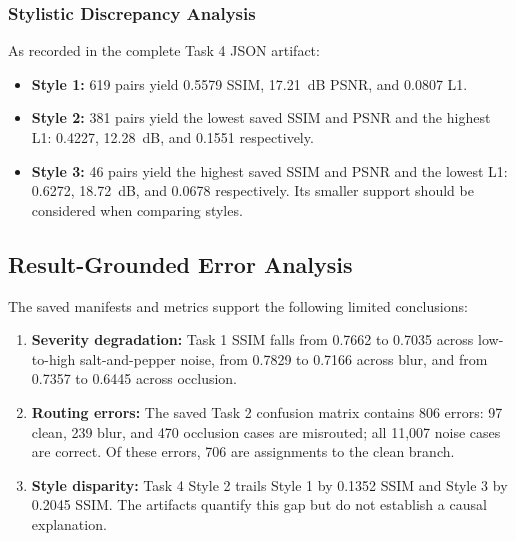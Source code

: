 \documentclass[journal,compsoc]{IEEEtran}
\begin{document}
\begin{table}[!h]
\caption{Task 4 cGAN Performance Breakdown Across Styles (FS2K Test Set, $N=1,046$)}
\label{tab:task4_style_breakdown}
\centering
{}
\end{table}

\subsubsection{Stylistic Discrepancy Analysis}
As recorded in the complete Task 4 JSON artifact:
\begin{itemize}
    \item \textbf{Style 1:} 619 pairs yield 0.5579 SSIM, 17.21~dB PSNR, and 0.0807 L1.
    \item \textbf{Style 2:} 381 pairs yield the lowest saved SSIM and PSNR and the highest L1: 0.4227, 12.28~dB, and 0.1551 respectively.
    \item \textbf{Style 3:} 46 pairs yield the highest saved SSIM and PSNR and the lowest L1: 0.6272, 18.72~dB, and 0.0678 respectively. Its smaller support should be considered when comparing styles.
\end{itemize}

\subsection{Result-Grounded Error Analysis}
The saved manifests and metrics support the following limited conclusions:
\begin{enumerate}
    \item \textbf{Severity degradation:} Task 1 SSIM falls from 0.7662 to 0.7035 across low-to-high salt-and-pepper noise, from 0.7829 to 0.7166 across blur, and from 0.7357 to 0.6445 across occlusion.
    \item \textbf{Routing errors:} The saved Task 2 confusion matrix contains 806 errors: 97 clean, 239 blur, and 470 occlusion cases are misrouted; all 11,007 noise cases are correct. Of these errors, 706 are assignments to the clean branch.
    \item \textbf{Style disparity:} Task 4 Style 2 trails Style 1 by 0.1352 SSIM and Style 3 by 0.2045 SSIM. The artifacts quantify this gap but do not establish a causal explanation.
\end{enumerate}
\end{document}
